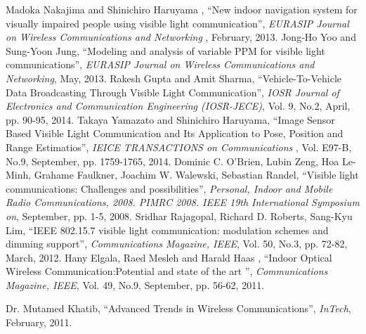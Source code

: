 \begin{thebibliography}{1}
 Madoka Nakajima and Shinichiro Haruyama , ``New indoor navigation system for visually impaired people using visible light
communication'', \emph{EURASIP Journal on Wireless Communications and Networking }, February, 2013.
 Jong-Ho Yoo and Sung-Yoon Jung, ``Modeling and analysis of variable PPM for visible light communications'', \emph{EURASIP Journal on Wireless Communications and Networking}, May, 2013.
 Rakesh Gupta and Amit Sharma, ``Vehicle-To-Vehicle Data Broadcasting Through Visible Light Communication'', \emph{IOSR Journal of Electronics and Communication Engineering (IOSR-JECE)}, Vol. 9, No.2, April, pp. 90-95, 2014.
 Takaya Yamazato and Shinichiro Haruyama, ``Image Sensor Based Visible Light Communication and Its Application to Pose, Position and Range Estimatios'', \emph{IEICE TRANSACTIONS on Communications }, Vol. E97-B, No.9, September, pp. 1759-1765, 2014.
 Dominic C. O'Brien, Lubin Zeng, Hoa Le-Minh, Grahame Faulkner, Joachim W. Walewski, Sebastian Randel, ``Visible light communications: Challenges and possibilities'', \emph{Personal, Indoor and Mobile Radio Communications, 2008. PIMRC 2008. IEEE 19th International Symposium on}, September, pp. 1-5, 2008.
 Sridhar Rajagopal, Richard D. Roberts, Sang-Kyu Lim, ``IEEE 802.15.7 visible light communication: modulation schemes and dimming support'', \emph{Communications Magazine, IEEE}, Vol. 50, No.3, pp. 72-82, March, 2012.
 Hany Elgala, Raed Mesleh and Harald Haas , ``Indoor Optical Wireless Communication:Potential and state of the art '', \emph{Communications Magazine, IEEE}, Vol. 49, No.9, September, pp. 56-62, 2011.

 Dr. Mutamed Khatib, ``Advanced Trends in Wireless Communications'', \emph{InTech}, February, 2011.


\end{thebibliography}
